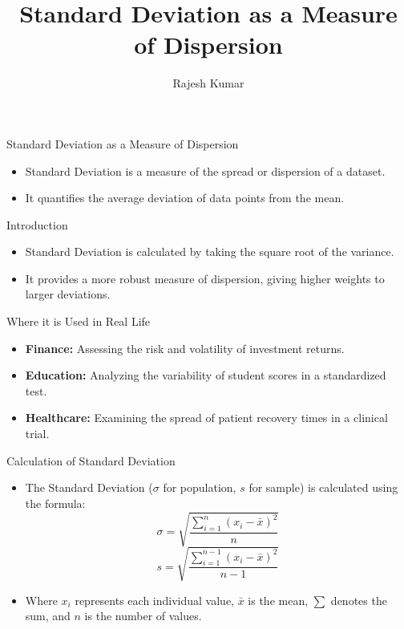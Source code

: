 
\title{Standard Deviation as a Measure of Dispersion}
\author{Rajesh Kumar}
\date{}

\begin{frame}
  \titlepage
\end{frame}

\begin{frame}{Standard Deviation as a Measure of Dispersion}
  \begin{itemize}
    \item Standard Deviation is a measure of the spread or dispersion of a dataset.
    \item It quantifies the average deviation of data points from the mean.
  \end{itemize}
\end{frame}

\begin{frame}{Introduction}
  \begin{itemize}
    \item Standard Deviation is calculated by taking the square root of the variance.
    \item It provides a more robust measure of dispersion, giving higher weights to larger deviations.
  \end{itemize}
\end{frame}

\begin{frame}{Where it is Used in Real Life}
  \begin{itemize}
    \item \textbf{Finance:} Assessing the risk and volatility of investment returns.
    \item \textbf{Education:} Analyzing the variability of student scores in a standardized test.
    \item \textbf{Healthcare:} Examining the spread of patient recovery times in a clinical trial.
  \end{itemize}
\end{frame}

\begin{frame}{Calculation of Standard Deviation}
  \begin{itemize}
    \item The Standard Deviation (\(\sigma\) for population, \(s\) for sample) is calculated using the formula:
    \[ \sigma = \sqrt{\frac{\sum_{i=1}^{n} (x_i - \bar{x})^2}{n}} \]
    \[ s = \sqrt{\frac{\sum_{i=1}^{n-1} (x_i - \bar{x})^2}{n-1}} \]
    \item Where \(x_i\) represents each individual value, \(\bar{x}\) is the mean, \(\sum\) denotes the sum, and \(n\) is the number of values.
  \end{itemize}
\end{frame}

